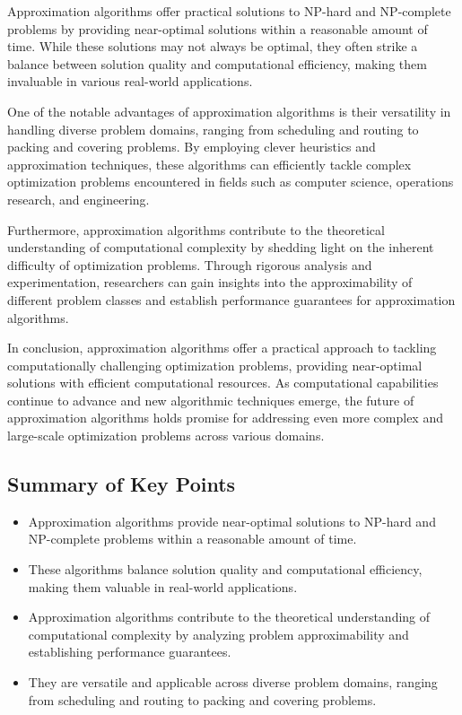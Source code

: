\documentclass[12pt]{book} %
\begin{document}
Approximation algorithms offer practical solutions to NP-hard and NP-complete problems by providing near-optimal solutions within a reasonable amount of time. While these solutions may not always be optimal, they often strike a balance between solution quality and computational efficiency, making them invaluable in various real-world applications.

One of the notable advantages of approximation algorithms is their versatility in handling diverse problem domains, ranging from scheduling and routing to packing and covering problems. By employing clever heuristics and approximation techniques, these algorithms can efficiently tackle complex optimization problems encountered in fields such as computer science, operations research, and engineering.

Furthermore, approximation algorithms contribute to the theoretical understanding of computational complexity by shedding light on the inherent difficulty of optimization problems. Through rigorous analysis and experimentation, researchers can gain insights into the approximability of different problem classes and establish performance guarantees for approximation algorithms.

In conclusion, approximation algorithms offer a practical approach to tackling computationally challenging optimization problems, providing near-optimal solutions with efficient computational resources. As computational capabilities continue to advance and new algorithmic techniques emerge, the future of approximation algorithms holds promise for addressing even more complex and large-scale optimization problems across various domains.

\subsection{Summary of Key Points}

\begin{itemize}
    \item Approximation algorithms provide near-optimal solutions to NP-hard and NP-complete problems within a reasonable amount of time.
    \item These algorithms balance solution quality and computational efficiency, making them valuable in real-world applications.
    \item Approximation algorithms contribute to the theoretical understanding of computational complexity by analyzing problem approximability and establishing performance guarantees.
    \item They are versatile and applicable across diverse problem domains, ranging from scheduling and routing to packing and covering problems.
\end{itemize}
\end{document}
